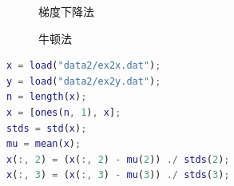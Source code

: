 \documentclass{sdureport}
\begin{document}
\begin{sduDocument}
	\begin{figure}[H]
		\caption{梯度下降法}
	\end{figure}
	\begin{figure}[H]
	\caption{牛顿法}
	\end{figure}

\end{sduDocument}

\begin{lstlisting}[language=matlab]
x = load("data2/ex2x.dat");
y = load("data2/ex2y.dat");
n = length(x);
x = [ones(n, 1), x];
stds = std(x);
mu = mean(x);
x(:, 2) = (x(:, 2) - mu(2)) ./ stds(2);
x(:, 3) = (x(:, 3) - mu(3)) ./ stds(3);
\end{lstlisting}
\end{document}
